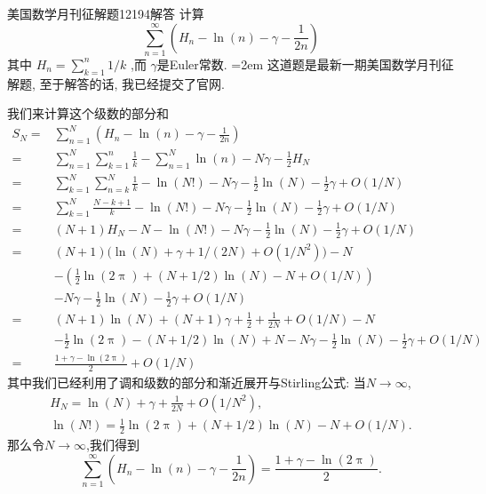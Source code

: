 \documentclass[UTF8,no-math,12pt,openany,table,dvipsnames,svgnames]{book}
\renewcommand{\pi}{\uppi}
\begin{document}
\begin{MYBOX}[colbacktitle=blue]{美国数学月刊征解题12194解答}
计算
  \[
    \sum_{n=1}^\infty\left(H_n-\ln(n)-\gamma-\frac1{2n}\right)
  \]
其中 $H_n=\sum_{k=1}^n1/k$ ,而 $\gamma$是Euler常数.
\tcblower\parindent=2em
这道题是最新一期美国数学月刊征解题, 至于解答的话, 我已经提交了官网.

我们来计算这个级数的部分和
\begin{align*}
  S_N = {}& \sum_{n=1}^N \left(H_n-\ln(n)-\gamma-\frac1{2n}\right)\\
      = {}& \sum_{n=1}^N\sum_{k=1}^n\frac1k -\sum_{n=1}^N\ln(n) -N\gamma -\frac12H_N\\
      = {}& \sum_{k=1}^N\sum_{n=k}^N\frac1k - \ln(N!) -N\gamma -\frac12\ln(N)-\frac12\gamma +O(1/N)\\
      = {}& \sum_{k=1}^N\frac{N-k+1}k - \ln(N!) -N\gamma -\frac12\ln(N) -\frac12\gamma +O(1/N) \\
      = {}& (N+1)H_N - N -\ln(N!) -N\gamma -\frac12\ln(N) -\frac12\gamma + O(1/N)\\
      = {}& (N+1)\bigl(\ln(N) +\gamma + 1/(2N) + O(1/N^2)  \bigr) - N\\
      & -\left( \frac12\ln(2\pi) + (N+1/2)\ln(N) -N + O(1/N) \right)\\
      & -N\gamma - \frac12\ln(N) -\frac12\gamma +O(1/N)\\
      = {}& (N+1)\ln(N) + (N+1)\gamma +\frac12 + \frac1{2N} +O(1/N)-N\\
      & -\frac12\ln(2\pi) - (N+1/2)\ln(N) +N-N\gamma-\frac12\ln(N)
      -\frac12\gamma +O(1/N)\\
      = {}& \frac{1+\gamma-\ln(2\pi)}2 + O(1/N)
\end{align*}
其中我们已经利用了调和级数的部分和渐近展开与Stirling公式: 当$N\to\infty$,
\begin{gather*}
  H_N = \ln(N) +\gamma +\frac1{2N} +O(1/N^2) ,\\
  \ln (N!) = \frac12\ln(2\pi) + (N+1/2)\ln(N) - N + O(1/N).
\end{gather*}
那么令$N\to\infty$,我们得到
\[
    \sum_{n=1}^\infty\left(H_n-\ln(n)-\gamma-\frac1{2n}\right)
     = \frac{1+\gamma-\ln(2\pi)}2 .
  \]
\end{MYBOX}
\end{document}
